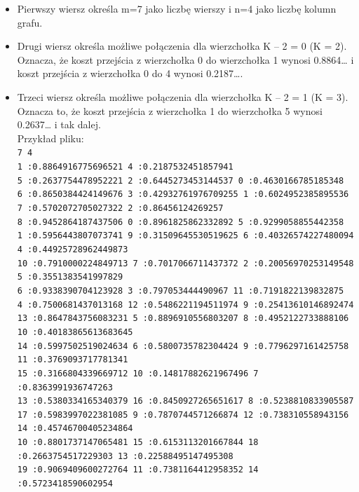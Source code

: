 \documentclass{article}
\begin{document}
\begin{itemize}
\begin{itemize}
\item Pierwszy wiersz określa m=7 jako liczbę wierszy i n=4 jako liczbę kolumn grafu.
\item Drugi wiersz określa możliwe połączenia dla wierzchołka K – 2 = 0 (K = 2). Oznacza, że koszt przejścia z wierzchołka 0 do wierzchołka 1 wynosi 0.8864… i koszt przejścia z wierzchołka 0 do 4 wynosi 0.2187….
\item Trzeci wiersz określa możliwe połączenia dla wierzchołka K – 2 = 1 (K = 3). Oznacza to, że koszt przejścia z wierzchołka 1 do wierzchołka 5 wynosi 0.2637… i tak dalej.\\
Przykład pliku: \\
\texttt{\footnotesize 7 4\\
	 1 :0.8864916775696521  4 :0.2187532451857941 \\
	 5 :0.2637754478952221  2 :0.6445273453144537  0 :0.4630166785185348 \\
	 6 :0.8650384424149676  3 :0.42932761976709255  1 :0.6024952385895536 \\
	 7 :0.5702072705027322  2 :0.86456124269257 \\
	 8 :0.9452864187437506  0 :0.8961825862332892  5 :0.9299058855442358 \\
	 1 :0.5956443807073741  9 :0.31509645530519625  6 :0.40326574227480094  4 :0.44925728962449873 \\
	 10 :0.7910000224849713  7 :0.7017066711437372  2 :0.20056970253149548  5 :0.3551383541997829 \\
	 6 :0.9338390704123928  3 :0.797053444490967  11 :0.7191822139832875 \\
	 4 :0.7500681437013168  12 :0.5486221194511974  9 :0.25413610146892474 \\
	 13 :0.8647843756083231  5 :0.8896910556803207  8 :0.4952122733888106  10 :0.40183865613683645\\ 
	 14 :0.5997502519024634  6 :0.5800735782304424  9 :0.7796297161425758  11 :0.3769093717781341\\ 
	 15 :0.3166804339669712  10 :0.14817882621967496  7 :0.8363991936747263 \\
	 13 :0.5380334165340379  16 :0.8450927265651617  8 :0.5238810833905587 \\
	 17 :0.5983997022381085  9 :0.7870744571266874  12 :0.738310558943156  14 :0.45746700405234864\\ 
	 10 :0.8801737147065481  15 :0.6153113201667844  18 :0.2663754517229303  13 :0.22588495147495308 \\
	 19 :0.9069409600272764  11 :0.7381164412958352  14 :0.5723418590602954 \\
}
\end{itemize}
\end{itemize}
\end{document}
